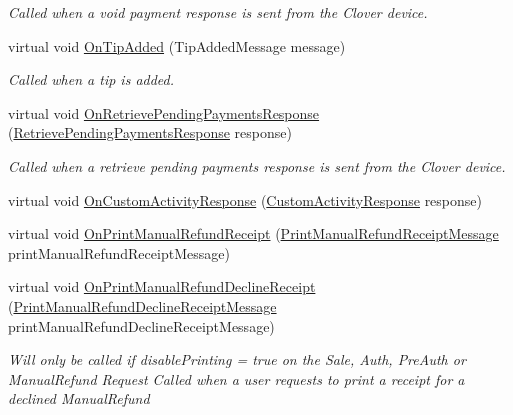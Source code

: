 \begin{DoxyCompactItemize}
\begin{DoxyCompactList}\small\item\em Called when a void payment response is sent from the Clover device. \end{DoxyCompactList}\item 
virtual void \hyperlink{classcom_1_1clover_1_1remotepay_1_1sdk_1_1_default_clover_connector_listener_a8d3f850e69a03e0ef259f992a4865b52}{On\+Tip\+Added} (Tip\+Added\+Message message)
\begin{DoxyCompactList}\small\item\em Called when a tip is added. \end{DoxyCompactList}\item 
virtual void \hyperlink{classcom_1_1clover_1_1remotepay_1_1sdk_1_1_default_clover_connector_listener_afb505c42e77209a31ce61911641f40cf}{On\+Retrieve\+Pending\+Payments\+Response} (\hyperlink{classcom_1_1clover_1_1remotepay_1_1sdk_1_1_retrieve_pending_payments_response}{Retrieve\+Pending\+Payments\+Response} response)
\begin{DoxyCompactList}\small\item\em Called when a retrieve pending payments response is sent from the Clover device. \end{DoxyCompactList}\item 
virtual void \hyperlink{classcom_1_1clover_1_1remotepay_1_1sdk_1_1_default_clover_connector_listener_a874fb9be8608ea95da432b9c7230d8ea}{On\+Custom\+Activity\+Response} (\hyperlink{classcom_1_1clover_1_1remotepay_1_1sdk_1_1_custom_activity_response}{Custom\+Activity\+Response} response)
\item 
virtual void \hyperlink{classcom_1_1clover_1_1remotepay_1_1sdk_1_1_default_clover_connector_listener_aed1c6c0e8dec09e3e724d752747d1b05}{On\+Print\+Manual\+Refund\+Receipt} (\hyperlink{classcom_1_1clover_1_1remotepay_1_1sdk_1_1_print_manual_refund_receipt_message}{Print\+Manual\+Refund\+Receipt\+Message} print\+Manual\+Refund\+Receipt\+Message)
\item 
virtual void \hyperlink{classcom_1_1clover_1_1remotepay_1_1sdk_1_1_default_clover_connector_listener_ad1ee83616c84ca13a0e02a3203d20f69}{On\+Print\+Manual\+Refund\+Decline\+Receipt} (\hyperlink{classcom_1_1clover_1_1remotepay_1_1sdk_1_1_print_manual_refund_decline_receipt_message}{Print\+Manual\+Refund\+Decline\+Receipt\+Message} print\+Manual\+Refund\+Decline\+Receipt\+Message)
\begin{DoxyCompactList}\small\item\em Will only be called if disable\+Printing = true on the Sale, Auth, Pre\+Auth or Manual\+Refund Request Called when a user requests to print a receipt for a declined Manual\+Refund \end{DoxyCompactList}\item 

\end{DoxyCompactItemize}
